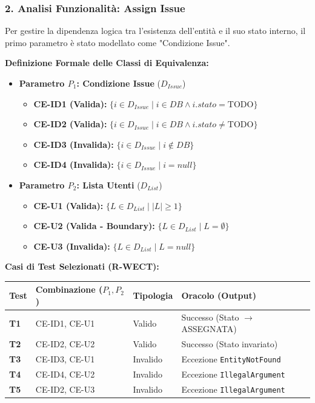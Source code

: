 \documentclass[a4paper,12pt]{article}
\begin{document}
\vspace{0.5cm}

\subsubsection*{2. Analisi Funzionalità: Assign Issue}
Per gestire la dipendenza logica tra l'esistenza dell'entità e il suo stato interno, il primo parametro è stato modellato come "Condizione Issue".

\textbf{Definizione Formale delle Classi di Equivalenza:}
\begin{itemize}
    \item \textbf{Parametro $P_1$: Condizione Issue} ($D_{Issue}$)
    \begin{itemize}
        \item \textbf{CE-ID1 (Valida):} $\{ i \in D_{Issue} \mid i \in DB \land i.stato = \text{TODO} \}$
        \item \textbf{CE-ID2 (Valida):} $\{ i \in D_{Issue} \mid i \in DB \land i.stato \neq \text{TODO} \}$
        \item \textbf{CE-ID3 (Invalida):} $\{ i \in D_{Issue} \mid i \notin DB \}$
        \item \textbf{CE-ID4 (Invalida):} $\{ i \in D_{Issue} \mid i = null \}$
    \end{itemize}
    
    \item \textbf{Parametro $P_2$: Lista Utenti} ($D_{List}$)
    \begin{itemize}
        \item \textbf{CE-U1 (Valida):} $\{ L \in D_{List} \mid |L| \ge 1 \}$
        \item \textbf{CE-U2 (Valida - Boundary):} $\{ L \in D_{List} \mid L = \emptyset \}$
        \item \textbf{CE-U3 (Invalida):} $\{ L \in D_{List} \mid L = null \}$
    \end{itemize}
\end{itemize}

\textbf{Casi di Test Selezionati (R-WECT):}
\begin{longtable}{|p{1.0cm}|p{4.5cm}|p{3.5cm}|p{4.5cm}|}
    \hline
    \rowcolor{UninaBlue} 
    \textbf{\color{white}Test} & \textbf{\color{white}Combinazione ($P_1, P_2$)} & \textbf{\color{white}Tipologia} & \textbf{\color{white}Oracolo (Output)} \\ 
    \hline
    \textbf{T1} & CE-ID1, CE-U1 & Valido & Successo (Stato $\to$ ASSEGNATA) \\ \hline
    \textbf{T2} & CE-ID2, CE-U2 & Valido & Successo (Stato invariato) \\ \hline
    \textbf{T3} & CE-ID3, CE-U1 & Invalido & Eccezione \texttt{EntityNotFound} \\ \hline
    \textbf{T4} & CE-ID4, CE-U2 & Invalido & Eccezione \texttt{IllegalArgument} \\ \hline
    \textbf{T5} & CE-ID2, CE-U3 & Invalido & Eccezione \texttt{IllegalArgument} \\ \hline
\end{longtable}
\end{document}
